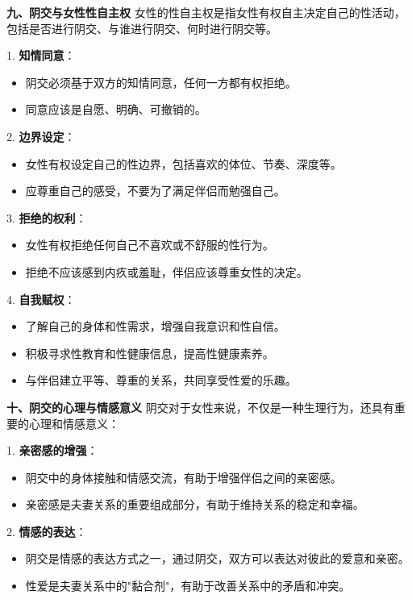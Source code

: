 \documentclass[12pt,UTF8]{ctexbook}
\begin{document}
\textbf{九、阴交与女性性自主权}
女性的性自主权是指女性有权自主决定自己的性活动，包括是否进行阴交、与谁进行阴交、何时进行阴交等。

1. \textbf{知情同意}：
\begin{itemize}
	\item 阴交必须基于双方的知情同意，任何一方都有权拒绝。
	\item 同意应该是自愿、明确、可撤销的。
\end{itemize}

2. \textbf{边界设定}：
\begin{itemize}
	\item 女性有权设定自己的性边界，包括喜欢的体位、节奏、深度等。
	\item 应尊重自己的感受，不要为了满足伴侣而勉强自己。
\end{itemize}

3. \textbf{拒绝的权利}：
\begin{itemize}
	\item 女性有权拒绝任何自己不喜欢或不舒服的性行为。
	\item 拒绝不应该感到内疚或羞耻，伴侣应该尊重女性的决定。
\end{itemize}

4. \textbf{自我赋权}：
\begin{itemize}
	\item 了解自己的身体和性需求，增强自我意识和性自信。
	\item 积极寻求性教育和性健康信息，提高性健康素养。
	\item 与伴侣建立平等、尊重的关系，共同享受性爱的乐趣。
\end{itemize}

\textbf{十、阴交的心理与情感意义}
阴交对于女性来说，不仅是一种生理行为，还具有重要的心理和情感意义：

1. \textbf{亲密感的增强}：
\begin{itemize}
	\item 阴交中的身体接触和情感交流，有助于增强伴侣之间的亲密感。
	\item 亲密感是夫妻关系的重要组成部分，有助于维持关系的稳定和幸福。
\end{itemize}

2. \textbf{情感的表达}：
\begin{itemize}
	\item 阴交是情感的表达方式之一，通过阴交，双方可以表达对彼此的爱意和亲密。
	\item 性爱是夫妻关系中的"黏合剂"，有助于改善关系中的矛盾和冲突。
\end{itemize}
\end{document}
